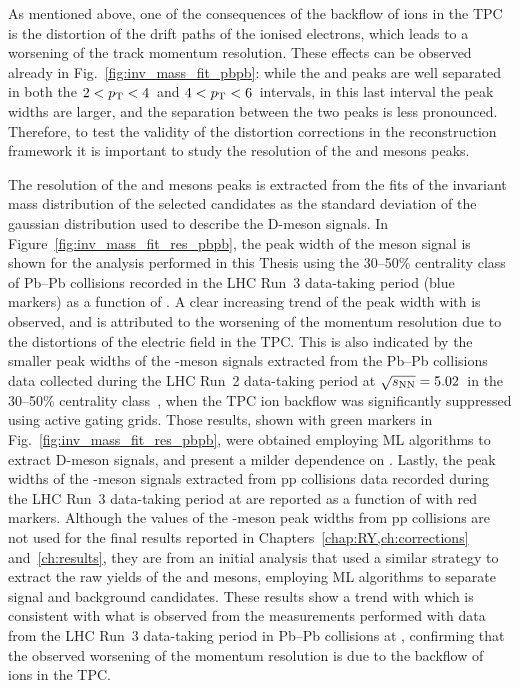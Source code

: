 As mentioned above, one of the consequences of the backflow of ions in the TPC is the distortion of the drift paths of the ionised electrons, which leads to a worsening of the track momentum resolution. These effects can be observed already in Fig.~\ref{fig:inv_mass_fit_pbpb}: while the \ds and \dpl peaks are well separated in both the  $2<p_\mathrm{T}<4$~\gevc and $4<p_\mathrm{T}<6$~\gevc intervals, in this last \pt interval the peak widths are larger, and the separation between the two peaks is less pronounced. Therefore, to test the validity of the distortion corrections in the reconstruction framework it is important to study the resolution of the \ds and \dpl mesons peaks. 

The resolution of the \ds and \dpl mesons peaks is extracted from the fits of the invariant mass distribution of the selected candidates as the standard deviation of the gaussian distribution used to describe the D-meson signals. In Figure~\ref{fig:inv_mass_fit_res_pbpb}, the peak width of the \ds meson signal is shown for the analysis performed in this Thesis using the 30--50\% centrality class of Pb--Pb collisions recorded in the LHC Run~3 data-taking period (blue markers) as a function of \pt. A clear increasing trend of the peak width with \pt is observed, and is attributed to the worsening of the momentum resolution due to the distortions of the electric field in the TPC. This is also indicated by the smaller peak widths of the \ds-meson signals extracted from the Pb--Pb collisions data collected during the LHC Run~2 data-taking period at $\sqrt{s_\mathrm{NN}}=5.02$~\tev in the 30--50\% centrality class~\cite{ALICE:2021kfc}, when the TPC ion backflow was significantly suppressed using active gating grids. Those results, shown with green markers in Fig.~\ref{fig:inv_mass_fit_res_pbpb}, were obtained employing ML algorithms to extract D-meson signals, and present a milder dependence on \pt. Lastly, the peak widths of the \ds-meson signals extracted from pp collisions data recorded during the LHC Run~3 data-taking period at \thirteen are reported as a function of \pt with red markers. Although the values of the \ds-meson peak widths from pp collisions are not used for the final results reported in Chapters~\ref{chap:RY,ch:corrections} and~\ref{ch:results}, they are from an initial analysis that used a similar strategy to extract the raw yields of the \ds and \dpl mesons, employing ML algorithms to separate signal and background candidates. These results show a trend with \pt which is consistent with what is observed from the measurements performed with data from the LHC Run~3 data-taking period in Pb--Pb collisions at \fivenn, confirming that the observed worsening of the momentum resolution is due to the backflow of ions in the TPC.


